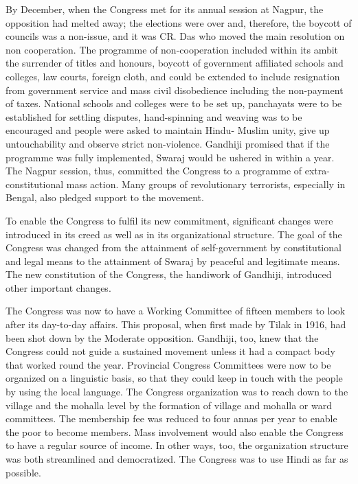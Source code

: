 By December, when the Congress met for its annual session at Nagpur, the opposition had melted away; the elections were over and, therefore, the boycott of councils was a non-issue, and it was CR. Das who moved the main resolution on non­ cooperation. The programme of non-cooperation included within its ambit the surrender of titles and honours, boycott of government affiliated schools and colleges, law courts, foreign cloth, and could be extended to include resignation from government service and mass civil disobedience including the non-payment of taxes. National schools and colleges were to be set up, panchayats were to be established for settling disputes, hand-spinning and weaving was to be encouraged and people were asked to maintain Hindu- Muslim unity, give up untouchability and observe strict non-violence. Gandhiji promised that if the programme was fully implemented, Swaraj would be ushered in within a year. The Nagpur session, thus, committed the Congress to a programme of extra-constitutional mass action. Many groups of revolutionary terrorists, especially in Bengal, also pledged support to the movement. 

To enable the Congress to fulfil its new commitment, significant changes were introduced in its creed as well as in its organizational structure. The goal of the Congress was changed from the attainment of self-government by constitutional and legal means to the attainment of Swaraj by peaceful and legitimate means. The new constitution of the Congress, the handiwork of Gandhiji, introduced other important changes. 

The Congress was now to have a Working Committee of fifteen members to look after its day-to-day affairs. This proposal, when first made by Tilak in 1916, had been shot down by the Moderate opposition. Gandhiji, too, knew that the Congress could not guide a sustained movement unless it had a compact body that worked round the year. Provincial Congress Committees were now to be organized on a linguistic basis, so that they could keep in touch with the people by using the local language. The Congress organization was to reach down to the village and the mohalla level by the formation of village and mohalla or ward committees. The membership fee was reduced to four annas per year to enable the poor to become members. Mass involvement would also enable the Congress to have a regular source of income. In other ways, too, the organization structure was both streamlined and democratized. The Congress was to use Hindi as far as possible.

